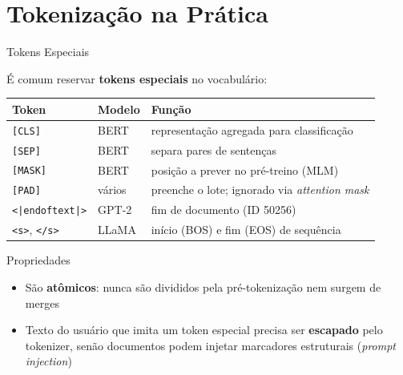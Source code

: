 \documentclass[aspectratio=169,xcolor=dvipsnames]{beamer}
\begin{document}
\section{Tokenização na Prática}

\begin{frame}{Tokens Especiais}

É comum reservar \textbf{tokens especiais} no vocabulário:

\begin{center}
\small
\renewcommand{\arraystretch}{1.1}
\begin{tabular}{lll}
\toprule
\textbf{Token} & \textbf{Modelo} & \textbf{Função} \\
\midrule
\texttt{[CLS]} & BERT & representação agregada para classificação \\
\texttt{[SEP]} & BERT & separa pares de sentenças \\
\texttt{[MASK]} & BERT & posição a prever no pré-treino (MLM) \\
\texttt{[PAD]} & vários & preenche o lote; ignorado via \textit{attention mask} \\
\texttt{<|endoftext|>} & GPT-2 & fim de documento (ID 50256) \\
\texttt{<s>}, \texttt{</s>} & LLaMA & início (BOS) e fim (EOS) de sequência \\
\bottomrule
\end{tabular}
\end{center}

\vspace{4pt}

\begin{block}{Propriedades}
\begin{itemize}
    \item São \textbf{atômicos}: nunca são divididos pela pré-tokenização nem surgem de merges
    \item Texto do usuário que imita um token especial precisa ser \textbf{escapado} pelo tokenizer, senão documentos podem injetar marcadores estruturais (\textit{prompt injection})
\end{itemize}
\end{block}

\end{frame}

\end{document}
